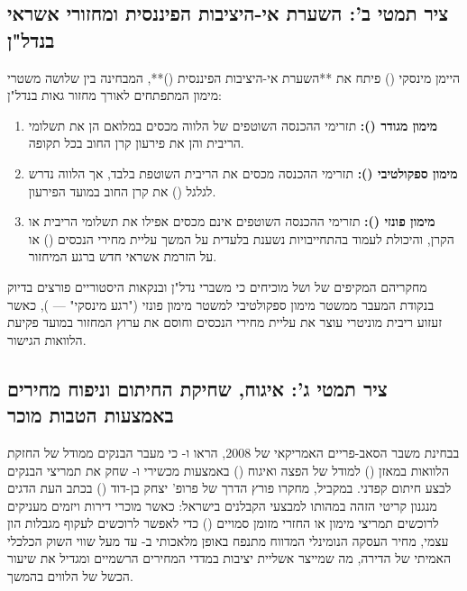 \subsection{ציר תמטי ב': השערת אי-היציבות הפיננסית ומחזורי אשראי בנדל"ן}
היימן מינסקי () \cite{minsky1992financial} פיתח את **השערת אי-היציבות הפיננסית ()**, המבחינה בין שלושה משטרי מימון המתפתחים לאורך מחזור גאות בנדל"ן:
\begin{enumerate}[leftmargin=*, itemsep=2pt]
  \item \textbf{מימון מגודר ():} תזרימי ההכנסה השוטפים של הלווה מכסים במלואם הן את תשלומי הריבית והן את פירעון קרן החוב בכל תקופה.
  \item \textbf{מימון ספקולטיבי ():} תזרימי ההכנסה מכסים את הריבית השוטפת בלבד, אך הלווה נדרש לגלגל () את קרן החוב במועד הפירעון.
  \item \textbf{מימון פונזי ():} תזרימי ההכנסה השוטפים אינם מכסים אפילו את תשלומי הריבית או הקרן, והיכולת לעמוד בהתחייבויות נשענת בלעדית על המשך עליית מחירי הנכסים () או על הזרמת אשראי חדש ברגע המיחזור.
\end{enumerate}
מחקריהם המקיפים של  \cite{kindleberger2011manias} ושל  \cite{reinhart2009this} מוכיחים כי משברי נדל"ן ובנקאות היסטוריים פורצים בדיוק בנקודת המעבר ממשטר מימון ספקולטיבי למשטר מימון פונזי ("רגע מינסקי" --- ), כאשר זעזוע ריבית מוניטרי עוצר את עליית מחירי הנכסים וחוסם את ערוץ המחזור במועד פקיעת הלוואות הגישור.

\subsection{ציר תמטי ג': איגוח, שחיקת החיתום וניפוח מחירים באמצעות הטבות מוכר}
בבחינת משבר הסאב-פריים האמריקאי של \num{2008}, הראו  \cite{keys2010did} ו- \cite{gorton2009securitized} כי מעבר הבנקים ממודל של החזקת הלוואות במאזן () למודל של הפצה ואיגוח () באמצעות מכשירי  ו- שחק את תמריצי הבנקים לבצע חיתום קפדני. במקביל, מחקרו פורץ הדרך של פרופ' יצחק בן-דוד () \cite{ben2011inflated} בכתב העת  הדגים מנגנון קריטי הזהה במהותו למבצעי הקבלנים בישראל: כאשר מוכרי דירות ויזמים מעניקים לרוכשים תמריצי מימון או החזרי מזומן סמויים () כדי לאפשר לרוכשים לעקוף מגבלות הון עצמי, מחיר העסקה הנומינלי המדווח מתנפח באופן מלאכותי ב- עד  מעל שווי השוק הכלכלי האמיתי של הדירה, מה שמייצר אשליית יציבות במדדי המחירים הרשמיים ומגדיל את שיעור הכשל של הלווים בהמשך.

